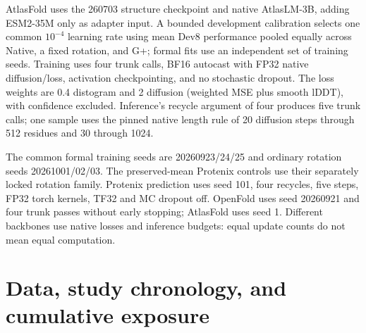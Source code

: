 AtlasFold uses the 260703 structure checkpoint and native AtlasLM-3B,
adding ESM2-35M only as adapter input. A bounded development calibration
selects one common $10^{-4}$ learning rate using mean Dev8 performance pooled
equally across Native, a fixed rotation, and G+; formal fits use an independent
set of training seeds. Training uses four trunk calls, BF16 autocast with FP32
native diffusion/loss, activation checkpointing, and no stochastic dropout.
The loss weights are 0.4 distogram and 2 diffusion (weighted MSE plus smooth
lDDT), with confidence excluded. Inference's recycle argument of four produces
five trunk calls; one sample uses the pinned native length rule of 20 diffusion
steps through 512 residues and 30 through 1024.

The common formal training seeds are 20260923/24/25 and ordinary rotation seeds
20261001/02/03. The preserved-mean Protenix controls use their separately locked
rotation family. Protenix prediction uses seed 101, four recycles, five steps,
FP32 torch kernels, TF32 and MC dropout off. OpenFold uses seed 20260921 and
four trunk passes without early stopping; AtlasFold uses seed 1. Different
backbones use native losses and inference budgets: equal update counts do not
mean equal computation.

\section{Data, study chronology, and cumulative exposure}
\label{app:chronology}



